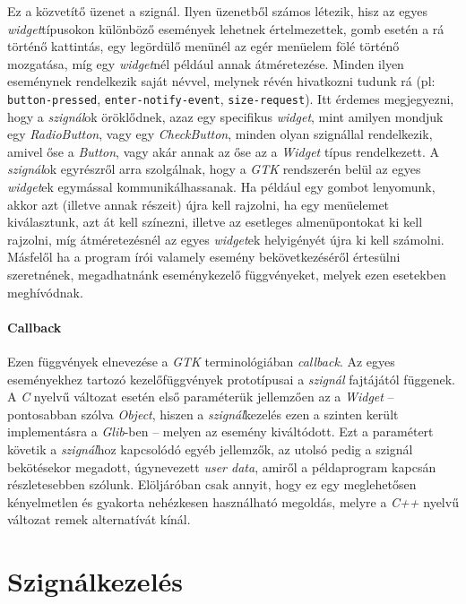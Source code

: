 Ez a közvetítő üzenet a szignál. Ilyen üzenetből számos létezik, hisz az egyes \textit{widget}típusokon különböző események lehetnek értelmezettek, gomb esetén a rá történő kattintás, egy legördülő menünél az egér menüelem fölé történő mozgatása, míg egy \textit{widget}nél például annak átméretezése. Minden ilyen eseménynek rendelkezik saját névvel, melynek révén hivatkozni tudunk rá (pl: \texttt{button-pressed}, \texttt{enter-notify-event}, \texttt{size-request}). Itt érdemes megjegyezni, hogy a \textit{szignál}ok öröklődnek, azaz egy specifikus \textit{widget}, mint amilyen mondjuk egy \textit{RadioButton}, vagy egy \textit{CheckButton}, minden olyan szignállal rendelkezik, amivel őse a \textit{Button}, vagy akár annak az őse az a \textit{Widget} típus rendelkezett. A \textit{szignál}ok egyrészről arra szolgálnak, hogy a \textit{GTK} rendszerén belül az egyes \textit{widget}ek egymással kommunikálhassanak. Ha például egy gombot lenyomunk, akkor azt (illetve annak részeit) újra kell rajzolni, ha egy menüelemet kiválasztunk, azt át kell színezni, illetve az esetleges almenüpontokat ki kell rajzolni, míg átméretezésnél az egyes \textit{widget}ek helyigényét újra ki kell számolni. Másfelől ha a program írói valamely esemény bekövetkezéséről értesülni szeretnének, megadhatnánk eseménykezelő függvényeket, melyek ezen esetekben meghívódnak.

\paragraph{Callback}

Ezen függvények elnevezése a \textit{GTK} terminológiában \textit{callback}. Az egyes eseményekhez tartozó kezelőfüggvények prototípusai a \textit{szignál} fajtájától függenek. A \textit{C} nyelvű változat esetén első paraméterük jellemzően az a \textit{Widget} -- pontosabban szólva \textit{Object}, hiszen a \textit{szignál}kezelés ezen a szinten került implementásra a \textit{Glib}-ben -- melyen az esemény kiváltódott. Ezt a paramétert követik a \textit{szignál}hoz kapcsolódó egyéb jellemzők, az utolsó pedig a szignál bekötésekor megadott, úgynevezett \textit{user data}, amiről a példaprogram kapcsán részletesebben szólunk. Elöljáróban csak annyit, hogy ez egy meglehetősen kényelmetlen és gyakorta nehézkesen használható megoldás, melyre a \textit{C++} nyelvű változat remek alternatívát kínál.

\section{Szignálkezelés}

